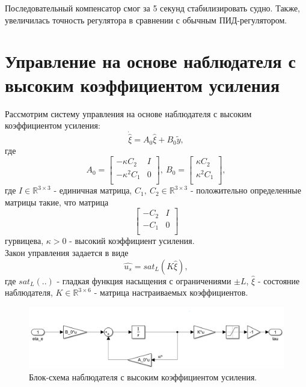 \documentclass[12pt]{article}
\begin{document}
Последовательный компенсатор смог за 5 секунд стабилизировать судно. Также, увеличилась точность регулятора в сравнении с обычным ПИД-регулятором. 

\section*{Управление на основе наблюдателя с высоким коэффициентом усиления}

Рассмотрим систему управления на основе наблюдателя с высоким коэффициентом усиления:
\[
\dot{\hat{\xi}} = A_0 \hat{\xi} + B_0 \tilde{y},
\]
где
\[
A_0 = \begin{bmatrix}
    -\kappa C_2 & I \\
    -\kappa^2 C_1 & 0 \\
\end{bmatrix}, \
B_0 = \begin{bmatrix}
    \kappa C_2 \\
    \kappa^2 C_1 \\
\end{bmatrix},
\]
где $I \in \mathbb{R}^{3 \times 3}$ - единичная матрица, $C_1, \ C_2 \in \mathbb{R}^{3 \times 3}$ -  положительно определенные матрицы такие, что
матрица
\[
\begin{bmatrix}
    -C_2 & I \\
    -C_1 & 0 \\
\end{bmatrix}
\]
гурвицева, $\kappa > 0$ - высокий коэффициент усиления.\\

Закон управления задается в виде
\[
\hat{u_s} = sat_L(K \hat{\xi}),
\]
где $sat_L(..)$ - гладкая функция насыщения с ограничениями $\pm L$, $\hat{\xi}$ - состояние наблюдателя, $K \in \mathbb{R}^{3 \times 6}$ - матрица настраиваемых коэффициентов.\\

\begin{figure}[H]
    \centering
    \includegraphics[width=\textwidth]{highgain_scheme.png}
    \caption{Блок-схема наблюдателя с высоким коэффициентом усиления.}
    \label{fig:highgain_scheme.png}
\end{figure}\\
\end{document}
